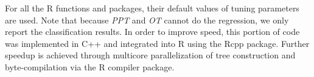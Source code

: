 \documentclass[nojss]{jss}
\numberwithin{equation}{section}
\begin{document}
	For all the R functions  and  packages, their default values of tuning parameters are used. Note that because \emph{PPT} and \emph{OT} cannot do the regression, we only report the classification results. In order to improve speed, this portion of code was implemented in C++ and integrated into R using the Rcpp package. Further speedup is achieved through multicore parallelization of tree construction and byte-compilation via the R compiler package.%
\end{document}
